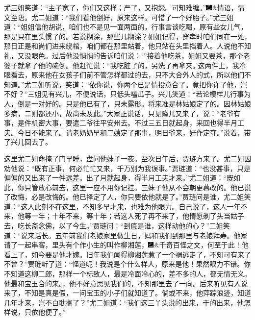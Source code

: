 尤三姐笑道：``主子宽了，你们又这样；严了，又抱怨。可知难缠。''{\includegraphics[width=3mm]{../Images/00003}\includegraphics[width=3mm]{../Images/00012}\footnotesize \kaishu 情语，情文至语。}尤二姐道：``我们看他倒好，原来这样。可惜了一个好胎子。''尤三姐道：``姐姐信他胡说，咱们也不是见一面两面的，行事言谈吃喝，原有些女儿气，那是只在里头惯了的。若说糊涂，那些儿糊涂？姐姐记得，穿孝时咱们同在一处，那日正是和尚们进来绕棺，咱们都在那里站着，他只站在头里挡着人。人说他不知礼，又没眼色。过后他没悄悄的告诉咱们说：`''接着他吃茶，姐姐又要茶，那个老婆子就拿了他的碗倒。他赶忙说：``我吃脏了的，另洗了再拿来。'这两件上，我冷眼看去，原来他在女孩子们前不管怎样都过的去，只不大合外人的式，所以他们不知道。''尤二姐听说，笑道：``依你说，你两个已是情投意合了。竟把你许了他，岂不好？''三姐见有兴儿，不便说话，只低头嗑瓜子。兴儿笑道：``若论模样儿行事为人，倒是一对好的。只是他已有了，只未露形。将来准是林姑娘定了的。因林姑娘多病，二则都还小，故尚未及此。''大家正说话，只见隆儿又来了，说：``老爷有事，是件机密大事，要遣二爷往平安州去。不过三五日就起身，来回也得半月工夫。今日不能来了。请老奶奶早和二姨定了那事，明日爷来，好作定夺。''说着，带了兴儿回去了。

这里尤二姐命掩了门早睡，盘问他妹子一夜。至次日午后，贾琏方来了。尤二姐因劝他说：``既有正事，何必忙忙又来，千万别为我误事。''贾琏道：``也没甚事，只是偏偏的又出来了一件远差。出了月就起身，得半月工夫才来。''尤二姐道：``既如此，你只管放心前去，这里一应不用你记挂。三妹子他从不会朝更暮改的。他已说了改悔，必是改悔的。他已择定了人，你只要依他就是了。''贾琏问是谁，尤二姐笑道：``这人此刻不在这里，不知多早才来，也难为他眼力。自己说了，这人一年不来，他等一年；十年不来，等十年；若这人死了再不来了，他情愿剃了头当姑子去，吃长斋念佛，以了今生。''贾琏问：``到底是谁，这样动他的心？''二姐笑道：``说来话长。五年前我们老娘家里做生日，妈和我们到那里与老娘拜寿。他家请了一起串客，里头有个作小生的叫作柳湘莲，{\includegraphics[width=3mm]{../Images/00003}\includegraphics[width=3mm]{../Images/00012}\footnotesize \kaishu 千奇百怪之文，何至于此！}他看上了，如今要是他才嫁。旧年我们闻得柳湘莲惹了一个祸逃走了，不知可有来了不曾？''贾琏听了道：``怪道呢！我说是个什么样人，原来是他！果然眼力不错。你不知道这柳二郎，那样一个标致人，最是冷面冷心的，差不多的人，都无情无义。他最和宝玉合的来。，他不好意思见我们的，不知那里去了一向。后来听见有人说来了，不知是真是假，一问宝玉的小子们就知道了。倘或不来，他萍踪浪迹，知道几年才来，岂不白耽搁了？''尤二姐道：``我们这三丫头说的出来，干的出来，他怎样说，只依他便了。''

